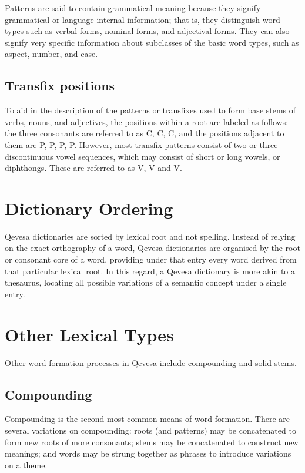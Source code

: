 \documentclass[grammar]{subfiles}
\begin{document}
  Patterns are said to contain grammatical meaning because they signify grammatical or language-internal information; that is, they distinguish word types such as verbal forms, nominal forms, and adjectival forms. They can also signify very specific information about subclasses of the basic word types, such as aspect, number, and case.

  \subsection{Transfix positions}
  \label{ssec:mt_transfix_positions}

  To aid in the description of the patterns or transfixes used to form base stems of verbs, nouns, and adjectives, the positions within a root are labeled as follows: the three consonants are referred to as C, C, C, and the positions adjacent to them are P, P, P, P.
  However, most transfix patterns consist of two or three discontinuous vowel sequences, which may consist of short or long vowels, or diphthongs. These are referred to as V, V and V. 

  \section{Dictionary Ordering}
  \label{sec:mt_dictionary_ordering}

  Qevesa dictionaries are sorted by lexical root and not spelling. Instead of relying on the exact orthography of a word, Qevesa dictionaries are organised by the root or consonant core of a word, providing under that entry every word derived from that particular lexical root. In this regard, a Qevesa dictionary is more akin to a thesaurus, locating all possible variations of a semantic concept under a single entry.

  \section{Other Lexical Types}
  \label{sec:mt_other_lexical_types}

  Other word formation processes in Qevesa include compounding and solid stems.

  \subsection{Compounding}
  \label{ssec:mt_morph_compounding}

  Compounding is the second-most common means of word formation. There are several variations on compounding: roots (and patterns) may be concatenated to form new roots of more consonants; stems may be concatenated to construct new meanings; and words may be strung together as phrases to introduce variations on a theme.
\end{document}

